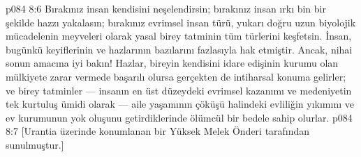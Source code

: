 \vs p084 8:6 Bırakınız insan kendisini neşelendirsin; bırakınız insan ırkı bin bir şekilde hazzı yakalasın; bırakınız evrimsel insan türü, yukarı doğru uzun biyolojik mücadelenin meyveleri olarak yasal birey tatminin tüm türlerini keşfetsin. İnsan, bugünkü keyiflerinin ve hazlarının bazılarını fazlasıyla hak etmiştir. Ancak, nihai sonun amacına iyi bakın! Hazlar, bireyin kendisini idare edişinin kurumu olan mülkiyete zarar vermede başarılı olursa gerçekten de intiharsal konuma gelirler; ve birey tatminler --- insanın en üst düzeydeki evrimsel kazanımı ve medeniyetin tek kurtuluş ümidi olarak --- aile yaşamının çöküşü halindeki evliliğin yıkımını ve ev kurumunun yok oluşunu getirdiklerinde ölümcül bir bedele sahip olurlar.
\vs p084 8:7 [Urantia üzerinde konumlanan bir Yüksek Melek Önderi tarafından sunulmuştur.]

